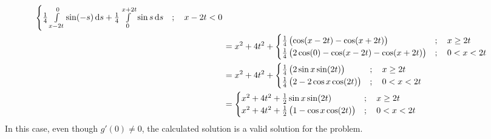 \documentclass[titlepage, fleqn, a4paper, 12pt, twoside]{article}
\theoremstyle{definition}
\theoremstyle{theorem}
\begin{document}
\begin{solution}
\begin{align*}
\begin{cases}
				\frac{1}{4} \int\limits_{x - 2 t}^{0} \sin(-s) \dif s + \frac{1}{4} \int\limits_{0}^{x + 2 t} \sin s \dif s &;\quad x - 2 t < 0\\
			\end{cases}\\
		&= x^2 + 4 t^2 +
			\begin{cases}
				\frac{1}{4} \left( \cos(x - 2 t) - \cos(x + 2 t) \right) &;\quad x \ge 2 t\\
				\frac{1}{4} \left( 2 \cos(0) - \cos(x - 2 t) - \cos(x + 2 t) \right) &;\quad 0 < x < 2 t\\
			\end{cases}\\
		&= x^2 + 4 t^2 +
			\begin{cases}
				\frac{1}{4} \left( 2 \sin x \sin(2 t) \right) &;\quad x \ge 2 t\\
				\frac{1}{4} \left( 2 - 2 \cos x \cos(2 t) \right) &;\quad 0 < x < 2 t\\
			\end{cases}\\
		&=
			\begin{cases}
				x^2 + 4 t^2 + \frac{1}{2} \sin x \sin(2 t) &;\quad x \ge 2 t\\
				x^2 + 4 t^2 + \frac{1}{2} \left( 1 - \cos x \cos(2 t) \right) &;\quad 0 < x < 2 t\\
			\end{cases}
	\end{align*}
	In this case, even though $g'(0) \neq 0$, the calculated solution is a valid solution for the problem.
\end{solution}
\end{document}
